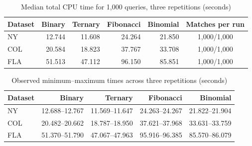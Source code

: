 \documentclass[12pt,a4paper]{report}
\begin{document}
\begin{table}[H]
  \centering
  \small
  \caption{Median total CPU time for 1,000 queries, three repetitions (seconds)}
  \label{tab:runtime}
  \begin{tabular}{lrrrrc}
    \toprule
    Dataset & Binary & Ternary & Fibonacci & Binomial & Matches per run \\
    \midrule
    NY & 12.744 & 11.608 & 24.264 & 21.850 & 1,000/1,000 \\
    COL & 20.584 & 18.823 & 37.767 & 33.708 & 1,000/1,000 \\
    FLA & 51.513 & 47.112 & 96.150 & 85.851 & 1,000/1,000 \\
    \bottomrule
  \end{tabular}
\end{table}
\begin{table}[H]
  \centering
  \small
  \caption{Observed minimum--maximum times across three repetitions (seconds)}
  \label{tab:runtime-ranges}
  \begin{tabular}{lrrrr}
    \toprule
    Dataset & Binary & Ternary & Fibonacci & Binomial \\
    \midrule
    NY & 12.688--12.767 & 11.569--11.647 & 24.263--24.267 & 21.822--21.904 \\
    COL & 20.482--20.662 & 18.787--18.950 & 37.621--37.968 & 33.631--33.759 \\
    FLA & 51.370--51.790 & 47.067--47.963 & 95.916--96.385 & 85.570--86.079 \\
    \bottomrule
  \end{tabular}
\end{table}
\end{document}
